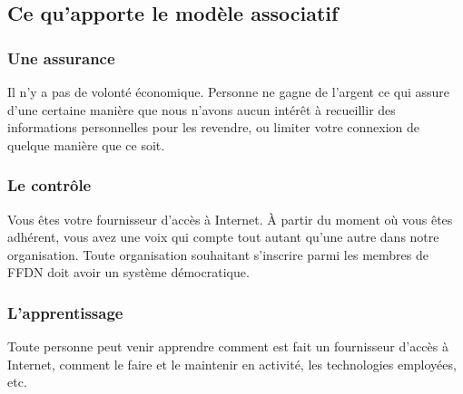 \subsection{Ce qu'apporte le modèle associatif}
\subsubsection{Une assurance}
Il n'y a pas de volonté économique.
Personne ne gagne de l'argent ce qui assure d'une certaine manière que nous 
n'avons aucun intérêt à recueillir des informations personnelles pour les revendre, 
ou limiter votre connexion de quelque manière que ce soit.

\subsubsection{Le contrôle}
Vous êtes votre fournisseur d'accès à Internet.
À partir du moment où vous êtes adhérent, vous avez une voix qui compte tout 
autant qu'une autre dans notre organisation.
Toute organisation souhaitant s'inscrire parmi les membres de FFDN doit avoir 
un système démocratique.

\subsubsection{L'apprentissage}
Toute personne peut venir apprendre comment est fait un fournisseur d'accès à Internet, 
	comment le faire et le maintenir en activité, 
	les technologies employées, etc. 
